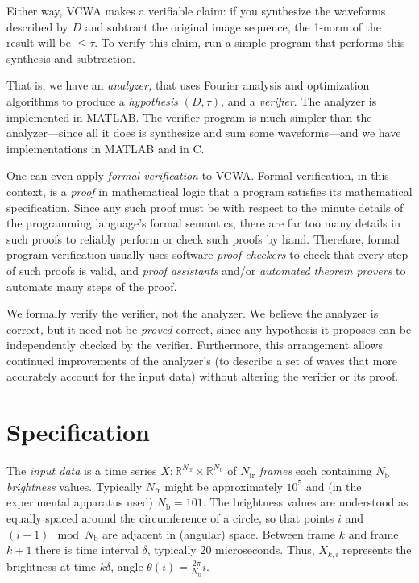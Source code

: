 \documentclass{article}
\begin{document}
Either way, VCWA makes a verifiable claim: if you synthesize the
waveforms described by $D$ and subtract the original image sequence,
the 1-norm of the result will be $\le \tau$.  To verify this claim, run
a simple program that performs this synthesis and subtraction.

That is, we have an \emph{analyzer,} that uses Fourier analysis and
optimization algorithms to produce a \emph{hypothesis} $(D,\tau)$, and
a \emph{verifier}.  The analyzer is implemented in MATLAB.  The
verifier program is much simpler than the analyzer---since all it does
is synthesize and sum some waveforms---and we have implementations in
MATLAB and in C.

One can even apply \emph{formal verification} to VCWA.  Formal
verification, in this context, is a \emph{proof} in mathematical logic
that a program satisfies its mathematical specification.  Since any
such proof must be with respect to the minute details of the
programming language's formal semantics, there are far too many
details in such proofs to reliably perform or check such proofs by
hand.  Therefore, formal program verification usually uses software
\emph{proof checkers} to check that every step of such proofs is
valid, and \emph{proof assistants} and/or \emph{automated theorem
provers} to automate many steps of the proof.

We formally verify the verifier, not the analyzer.  We believe the analyzer is correct, but it need not
be \emph{proved} correct, since any hypothesis it proposes can be independently checked by the verifier.
Furthermore, this arrangement allows continued improvements of the analyzer's
(to describe a set of waves that more accurately account for the input data) without
altering the verifier or its proof.

\section{Specification}
\newcommand\Nfr{\ensuremath{{N_\mathrm{fr}}}}
\newcommand\Nb{\ensuremath{{N_\mathrm{b}}}}
\newcommand\NB{\ensuremath{{N_\mathrm{B}}}}
The \emph{input data} is a time series $X: \mathbb{R}^\Nfr \times \mathbb{R}^\Nb$
of $\Nfr$ \emph{frames} each containing $\Nb$ \emph{brightness} values.
Typically $\Nfr$ might be approximately $10^5$ and (in the experimental apparatus used) $\Nb=101$.  
The brightness
values are understood as equally spaced around the circumference of a circle, so that
points $i$ and \mbox{$(i+1) \mod \Nb$} are adjacent in (angular) space.
Between frame $k$ and frame $k+1$ there is
time interval $\delta$, typically 20 microseconds.
Thus, $X_{k,i}$
represents the brightness at time $k\delta$, angle $\theta(i) = \frac{2\pi}{\Nb}i$.  
\end{document}
